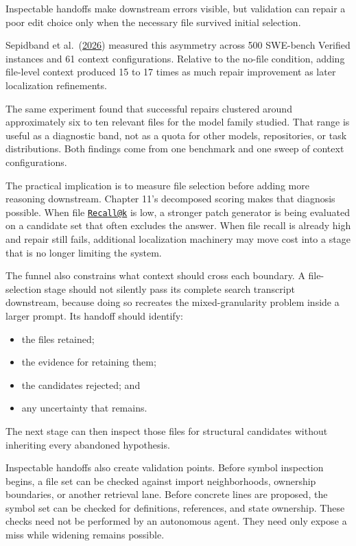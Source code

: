 Inspectable handoffs make downstream errors visible, but validation can repair a poor edit choice only when the necessary file survived initial selection.

Sepidband et al.~(\href{https://arxiv.org/abs/2604.05481}{2026}) measured this asymmetry across 500 SWE-bench Verified instances and 61 context configurations. Relative to the no-file condition, adding file-level context produced 15 to 17 times as much repair improvement as later localization refinements.

The same experiment found that successful repairs clustered around approximately six to ten relevant files for the model family studied. That range is useful as a diagnostic band, not as a quota for other models, repositories, or task distributions. Both findings come from one benchmark and one sweep of context configurations.

The practical implication is to measure file selection before adding more reasoning downstream. Chapter 11's decomposed scoring makes that diagnosis possible. When file \href{mailto:Recall@k}{\nolinkurl{Recall@k}} is low, a stronger patch generator is being evaluated on a candidate set that often excludes the answer. When file recall is already high and repair still fails, additional localization machinery may move cost into a stage that is no longer limiting the system.

The funnel also constrains what context should cross each boundary. A file-selection stage should not silently pass its complete search transcript downstream, because doing so recreates the mixed-granularity problem inside a larger prompt. Its handoff should identify:

\begin{itemize}
\tightlist
\item
  the files retained;
\item
  the evidence for retaining them;
\item
  the candidates rejected; and
\item
  any uncertainty that remains.
\end{itemize}

The next stage can then inspect those files for structural candidates without inheriting every abandoned hypothesis.

Inspectable handoffs also create validation points. Before symbol inspection begins, a file set can be checked against import neighborhoods, ownership boundaries, or another retrieval lane. Before concrete lines are proposed, the symbol set can be checked for definitions, references, and state ownership. These checks need not be performed by an autonomous agent. They need only expose a miss while widening remains possible.

